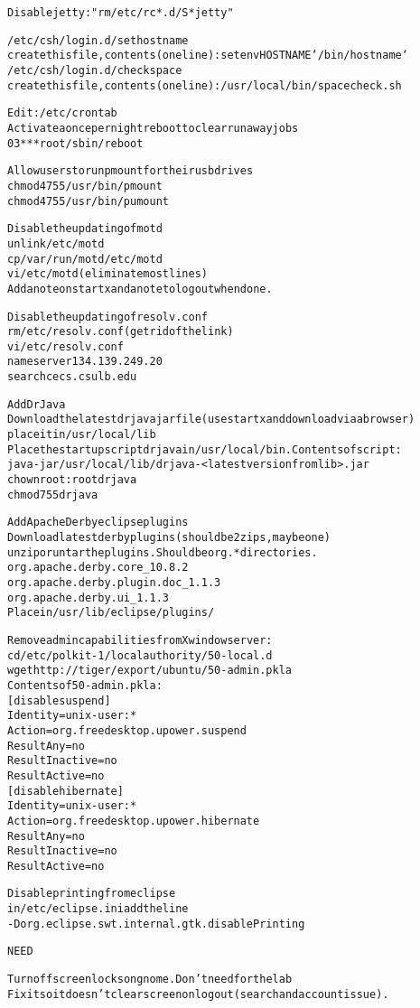 \begin{alltt}
Disable jetty: "rm /etc/rc*.d/S*jetty"

/etc/csh/login.d/sethostname
 create this file, contents (one line): setenv HOSTNAME `/bin/hostname`
/etc/csh/login.d/checkspace
 create this file, contents (one line): /usr/local/bin/spacecheck.sh

Edit: /etc/crontab
 Activate a once per night reboot to clear run away jobs
  0 3 * * * root /sbin/reboot

Allow users to run pmount for their usb drives
 chmod 4755 /usr/bin/pmount 
 chmod 4755 /usr/bin/pumount 

Disable the updating of motd
 unlink /etc/motd
 cp /var/run/motd /etc/motd
 vi /etc/motd (eliminate most lines)
 Add a note on startx and a note to log out when done. 

Disable the updating of resolv.conf
 rm /etc/resolv.conf  (get rid of the link)
 vi /etc/resolv.conf
  nameserver 134.139.249.20
  search cecs.csulb.edu


Add DrJava
 Download the latest drjava jar file (use startx and download via a browser)
  place it in /usr/local/lib
 Place the startup script drjava in /usr/local/bin. Contents of script:
  java -jar /usr/local/lib/drjava-<latest version from lib>.jar
  chown root:root drjava
  chmod 755 drjava

Add Apache Derby eclipse plugins
 Download latest derby plugins (should be 2 zips, may be one)
  unzip or untar the plugins. Should be org.* directories.
   org.apache.derby.core_10.8.2
   org.apache.derby.plugin.doc_1.1.3
   org.apache.derby.ui_1.1.3
 Place in /usr/lib/eclipse/plugins/
   
Remove admin capabilities from X window server:
 cd /etc/polkit-1/localauthority/50-local.d
 wget http://tiger/export/ubuntu/50-admin.pkla
  Contents of 50-admin.pkla:
      [disable suspend]
        Identity=unix-user:*
        Action=org.freedesktop.upower.suspend
        ResultAny=no
        ResultInactive=no
        ResultActive=no
      [disable hibernate]
        Identity=unix-user:*
        Action=org.freedesktop.upower.hibernate
        ResultAny=no
        ResultInactive=no
        ResultActive=no

Disable printing from eclipse
  in /etc/eclipse.ini add the line
   -Dorg.eclipse.swt.internal.gtk.disablePrinting

NEED

Turn off screen locks on gnome. Don't need for the lab
Fix it so it doesn't clear screen on logout (search and account issue).


\end{alltt}
